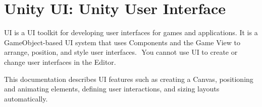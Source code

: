 \chapter{Unity UI\+: Unity User Interface}
\hypertarget{md__hey_tea_9_2_library_2_package_cache_2com_8unity_8ugui_0d1_80_80_2_documentation_0i_2index}{}\label{md__hey_tea_9_2_library_2_package_cache_2com_8unity_8ugui_0d1_80_80_2_documentation_0i_2index}
\label{md__hey_tea_9_2_library_2_package_cache_2com_8unity_8ugui_0d1_80_80_2_documentation_0i_2index_autotoc_md4836}%
%
  UI is a UI toolkit for developing user interfaces for games and applications. It is a Game\+Object-\/based UI system that uses Components and the Game View to arrange, position, and style user interfaces. ​ You cannot use  UI to create or change user interfaces in the  Editor.

This documentation describes  UI features such as creating a Canvas, positioning and animating elements, defining user interactions, and sizing layouts automatically. 